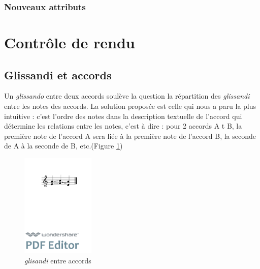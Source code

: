 \documentclass{article}
\newenvironment{gmncode}	{\vspace{-2mm}\small\verbatim}{\endverbatim\vspace{-2mm}}
\begin{document}
\subsubsection{Nouveaux attributs}\label{subsubsec:attributs}



\section{Contr\^ole de rendu}\label{sec:controleRendu}

\subsection{Glissandi et accords}\label{subsec:glissandiAccords}

Un \emph{glissando} entre deux accords soulève la question la répartition des \emph{glissandi} entre les notes des accords. La solution proposée est celle qui nous a paru la plus intuitive : c'est l'ordre des notes dans la description textuelle de l'accord qui détermine les relations entre les notes, c'est à dire : pour 2 accords A t B, la première note de l'accord A sera liée à la première note de l'accord B, la seconde de A à la seconde de B, etc.(Figure \ref{fig:glissandosimple})

\begin{figure}[h]
\begin{center}
\begin{gmncode}
[\glissando({e,a} {f,b} {a,d})]
\end{gmncode}
\bigskip

\includegraphics[width=35mm]{img/glissandosimple.pdf}
\caption{\emph{glisandi} entre accords}
\label{fig:glissandosimple}
\end{center}
\end{figure}
\end{document}

